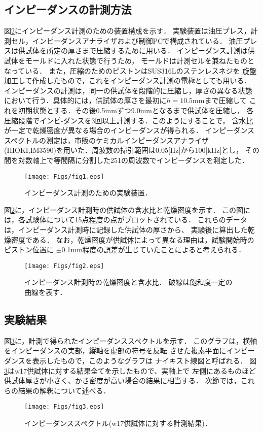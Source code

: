 \documentclass{jsce}
\begin{document}
\subsection{インピーダンスの計測方法}
図\ref{fig:fig2}にインピーダンス計測のための装置構成を示す．
実験装置は油圧プレス，計測セル，インピーダンスアナライザおよび制御PCで構成されている．
油圧プレスは供試体を所定の厚さまで圧縮するために用いる．
インピーダンス計測は供試体をモールドに入れた状態で行うため，
モールドは計測セルを兼ねたものとなっている．
また，圧縮のためのピストンはSUS316Lのステンレスネジを
旋盤加工して作成したもので，これをインピーダンス計測の電極としても用いる．
インピーダンスの計測は，同一の供試体を段階的に圧縮し，厚さの異なる状態
において行う．具体的には，供試体の厚さを最初に$h=10.5$mmまで圧縮して
これを初期状態とする．その後0.5mmずつ9.0mmとなるまで供試体を圧縮し，
各圧縮段階でインピ-ダンスを3回以上計測する．このようにすることで，
含水比が一定で乾燥密度が異なる場合のインピーダンスが得られる．
インピーダンススペクトルの測定は，市販のケミカルインピーダンスアナライザ
(HIOKI,IM3590)を用いた．周波数の掃引範囲は0.05[Hz]から100[kHz]とし，
その間を対数軸上で等間隔に分割した251の周波数でインピーダンスを測定した．
\begin{figure}[h]
	\begin{center}
	\texttt{[image: Figs/fig1.eps]} 
	\end{center}
	\caption{
		インピーダンス計測のための実験装置．
	} 
	\label{fig:fig1}
\end{figure}
図\ref{fig:fig2}に，インピーダンス計測時の供試体の含水比と乾燥密度を示す．
この図には，各試験体について15点程度の点がプロットされている．
これらのデータは，インピーダンス計測時に記録した供試体の厚さから、
実験後に算出した乾燥密度である．
なお，乾燥密度が供試体によって異なる理由は，試験開始時のピストン位置に
$\pm$0.1mm程度の誤差が生じていたことによると考えられる．
\begin{figure}[h]
	\begin{center}
	\texttt{[image: Figs/fig2.eps]} 
	\end{center}
	\caption{
		インピーダンス計測時の乾燥密度と含水比．
		破線は飽和度一定の曲線を表す．
	} 
	\label{fig:fig2}
\end{figure}
\subsection{実験結果}
図\ref{fig:fig3}に，計測で得られたインピーダンススペクトルを示す．
このグラフは，横軸をインピーダンスの実部，縦軸を虚部の符号を反転
させた複素平面にインピーダンスを表示したもので，このようなグラフは
ナイキスト線図と呼ばれる．
図\ref{fig:fig3}はw17供試体に対する結果全てを示したもので、実軸上で
左側にあるものほど供試体厚さが小さく、かさ密度が高い場合の結果に相当する．
次節では，これらの結果の解釈について述べる．
\begin{figure}[h]
	\begin{center}
	\texttt{[image: Figs/fig3.eps]} 
	\end{center}
	\caption{
		インピーダンススペクトル(w17供試体に対する計測結果)．
	} 
	\label{fig:fig3}
\end{figure}
\end{document}
